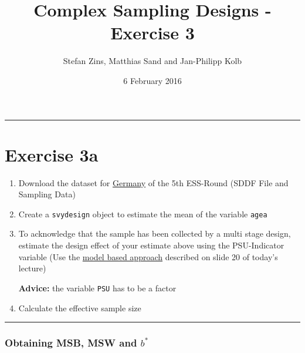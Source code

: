 \documentclass[]{article}
\title{Complex Sampling Designs - Exercise 3}
\author{Stefan Zins, Matthias Sand and Jan-Philipp Kolb}
\date{6 February 2016}
\begin{document}
\maketitle


\begin{center}\rule{0.5\linewidth}{\linethickness}\end{center}

\section{Exercise 3a}\label{exercise-3a}

\begin{enumerate}
\def\labelenumi{\arabic{enumi}.}
\item
  Download the dataset for
  \href{http://www.europeansocialsurvey.org/data/country.html?c=germany}{Germany}
  of the 5th ESS-Round (SDDF File and Sampling Data)
\item
  Create a \texttt{svydesign} object to estimate the mean of the
  variable \texttt{agea}
\item
  To acknowledge that the sample has been collected by a multi stage
  design, estimate the design effect of your estimate above using the
  PSU-Indicator variable (Use the
  \href{https://github.com/BernStZi/SamplingAndEstimation/blob/short/lecture/part_2.pdf}{model
  based approach} described on slide 20 of today's lecture)

  \textbf{Advice:} the variable \texttt{PSU} has to be a factor\\
\item
  Calculate the effective sample size
\end{enumerate}

\begin{center}\rule{0.5\linewidth}{\linethickness}\end{center}

\subsubsection{Obtaining MSB, MSW and
\(b^{*}\)}\label{obtaining-msb-msw-and-b}
\end{document}
